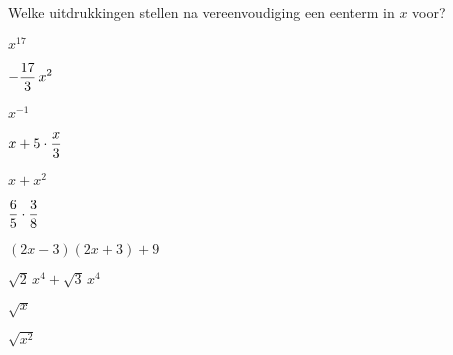 \documentclass{ximera}
\begin{document}
	\author{Koen De Naeghel - Wiskunde Op Maat}
	\xmsource
	\label{xim:veeltermen_basisbegrippen_oefeningen_reeks1}


\begin{exercise}
Welke uitdrukkingen stellen na vereenvoudiging een eenterm in \(x\) voor? 
\renewcommand{\TJa }{\makebox[2.5cm]{Een eenterm }}
\renewcommand{\TNee}{\makebox[2.5cm]{Geen eenterm}}

\begin{multicols}{2}
	\begin{question} \choiceYes  \( x^{17}                         \)   \end{question}
	\begin{question} \choiceYes  \( \displaystyle -\frac{17}{3}\,x^2          \)   \end{question}
	\begin{question} \choiceNo   \( x^{-1}                         \)   \end{question}
	\begin{question} \choiceYes  \( \displaystyle x + 5\cdot \frac{x}{3}      \)   \end{question}
	\begin{question} \choiceNo   \( x + x^2                        \)   \end{question}
	\begin{question} \choiceYes  \( \displaystyle \frac{6}{5}\cdot\frac{3}{8} \)   \end{question}
	\begin{question} \choiceYes  \( (2x-3)(2x+3)+9                 \)   \end{question}
	\begin{question} \choiceYes  \( \sqrt{2}\,x^4 + \sqrt{3}\,x^4  \)   \end{question}
	\begin{question} \choiceNo   \( \sqrt{x}                       \)   \end{question}
	\begin{question} \choiceNo   \( \sqrt{x^2}                     \)   \end{question}
\end{multicols}
\end{exercise}
\end{document}
